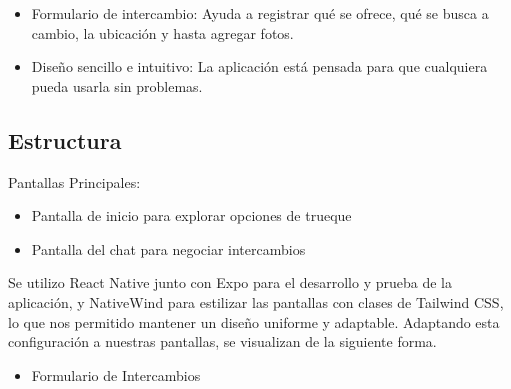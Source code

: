 \documentclass[11pt, a4paper, oneside]{book}
\begin{document}
\begin{itemize} 

    \item Formulario de intercambio: Ayuda a registrar qué se ofrece, qué se busca a cambio, la ubicación y hasta agregar fotos. 

\end{itemize} 

\begin{itemize} 

    \item Diseño sencillo e intuitivo: La aplicación está pensada para que cualquiera pueda usarla sin problemas. 

\end{itemize} 

\subsection{Estructura} 

     Pantallas Principales: 

\begin{itemize} 

    \item Pantalla de inicio para explorar opciones de trueque  

\end{itemize} 

\begin{itemize} 

    \item Pantalla del chat para negociar intercambios  

\end{itemize} 


\vspace{3cm}
Se utilizo React Native junto con Expo para el
desarrollo y prueba de la aplicación, y NativeWind para estilizar las pantallas con clases
de Tailwind CSS, lo que nos permitido mantener un diseño uniforme y adaptable.
Adaptando esta configuración a nuestras pantallas, se visualizan de la siguiente forma.



\begin{itemize} 

    \item Formulario de Intercambios   

\end{itemize} 
\end{document}
